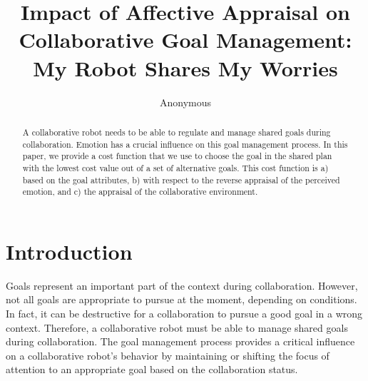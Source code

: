\documentclass[conference]{IEEEtran}
\begin{document}
\title{{\fontsize{19}{20}\selectfont Impact of Affective Appraisal on
Collaborative Goal Management:\\My Robot Shares My Worries}}


\author{Anonymous}

\maketitle

\begin{abstract}
A collaborative robot needs to be able to regulate and manage shared goals
during collaboration. Emotion has a crucial influence on this goal management
process. In this paper, we provide a cost function that we use to choose the
goal in the shared plan with the lowest cost value out of a set of alternative
goals. This cost function is a) based on the goal attributes, b) with respect to
the reverse appraisal of the perceived emotion, and c) the appraisal of the
collaborative environment.
\end{abstract}

\IEEEpeerreviewmaketitle
\vspace*{-2mm}
\section{Introduction}
\vspace*{-2mm}
Goals represent an important part of the context during collaboration. However,
not all goals are appropriate to pursue at the moment, depending on conditions.
In fact, it can be destructive for a collaboration to pursue a good goal in a
wrong context. Therefore, a collaborative robot must be able to manage shared
goals during collaboration. The goal management process provides a critical
influence on a collaborative robot's behavior by maintaining or shifting the
focus of attention to an appropriate goal based on the collaboration status.
\end{document}
